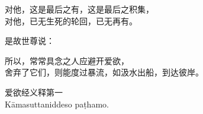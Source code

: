 \begin{quoting}
    \begin{quoting}
        对他，这是最后之有，这是最后之积集，\\
        对他，已无生死的轮回，已无再有。

    \end{quoting}
\end{quoting}

是故世尊说：


\begin{quoting}所以，常常具念之人应避开爱欲，\\舍弃了它们，则能度过暴流，如汲水出船，到达彼岸。\end{quoting}


\begin{center}\vspace{2em}
    爱欲经义释第一\\
    Kāmasuttaniddeso paṭhamo.
\end{center}